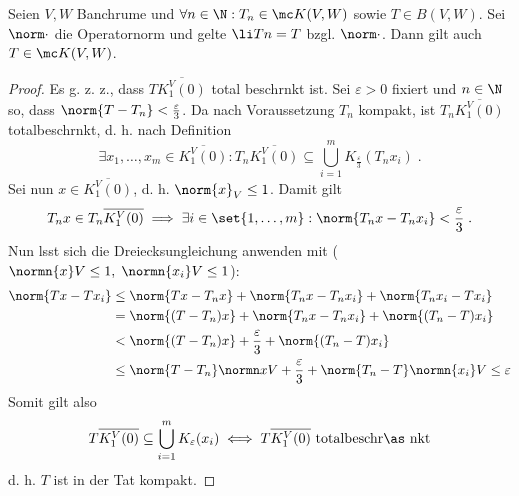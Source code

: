 \begin{theorem}
	Seien \(V,W\) Banchr\as ume und \(\forall n \in \N: T_n \in \mc K(V,W)\) sowie \(T\in B(V,W)\). Sei \(\norm\cdot\) die Operatornorm und gelte \(\li Tn = T\) bzgl. \(\norm\cdot\). Dann gilt auch \(T\in \mc K(V,W)\).
\end{theorem}

\begin{proof}
	Es g. z. z., dass \(T\overline{K_1^V(0)}\) total beschr\as nkt ist. Sei \(\varepsilon > 0\) fixiert und \(n \in \N\) so, dass \(\norm{T-T_n}<\frac{\varepsilon}{3}\). Da nach Voraussetzung $T_n$ kompakt, ist \(T_n \overline{K_1^V(0)}\) totalbeschr\as nkt, d. h. nach Definition
	\[\exists x_1,\ldots,x_m \in \overline{K_1^V(0)}: T_n \overline{K_1^V(0)} \subseteq \bigcup_{i=1}^m K_{\frac\varepsilon3}(T_n x_i)\;.\]
	Sei nun \(x\in \overline{K_1^V(0)}\), d. h. \(\norm{x}_V \leq 1\). Damit gilt
	\[T_n x \in T_n\overline{K_1^V(0)} \implies \exists i\in \set{1,\ldots,m}: \norm{T_n x - T_n x_i} < \frac{\varepsilon}{3}\;.\]
	Nun l\as sst sich die Dreiecksungleichung anwenden mit (\(\normn{x}V \leq 1, \;\normn{x_i}V \leq 1\)):
	\begin{align*}
		\norm{Tx - Tx_i} &\leq \norm{Tx - T_n x} + \norm{T_n x - T_n x_i} + \norm{T_n x_i - T x_i}\\
		&  = \norm{(T-T_n)x }+ \norm{T_n x - T_n x_i}  + \norm{(T_n -T)x_i}\\
		& < \norm{(T-T_n)x }+ \frac\varepsilon 3 + \norm{(T_n -T)x_i}\\
		&\leq \norm{T-T_n}\normn xV + \frac\varepsilon 3 +\norm{T_n - T} \normn{x_i}V \leq \varepsilon
	\end{align*}
	Somit gilt also 
	\[T\overline{K_1^V(0)} \subseteq \bigcup_{i=1}^m K_\varepsilon (x_i) \iff T\overline{K_1^V(0)} \text{ totalbeschr\as nkt}\]
	d. h. $T$ ist in der Tat kompakt. 
\end{proof}